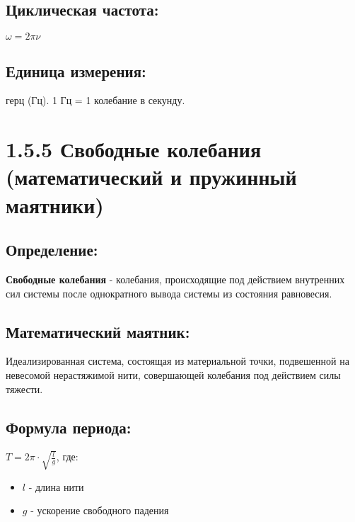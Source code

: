\documentclass[a4paper,12pt]{article}
\begin{document}
\vspace{-9pt}
\subsection*{Циклическая частота:}
\vspace{-3pt}
$\omega = 2\pi\nu$

\vspace{-9pt}
\subsection*{Единица измерения:}
\vspace{-3pt}
герц (Гц). 1 Гц = 1 колебание в секунду.

\newpage
\section*{1.5.5 Свободные колебания (математический и пружинный маятники)}

\vspace{-9pt}
\subsection*{Определение:}
\vspace{-3pt}
\textbf{Свободные колебания} - колебания, происходящие под действием внутренних сил системы после однократного вывода системы из состояния равновесия.

\vspace{-9pt}
\subsection*{Математический маятник:}
\vspace{-3pt}
Идеализированная система, состоящая из материальной точки, подвешенной на невесомой нерастяжимой нити, совершающей колебания под действием силы тяжести.

\vspace{-9pt}
\subsection*{Формула периода:}
\vspace{-3pt}
$T = 2\pi \cdot \sqrt{\frac{l}{g}}$, где:
\begin{itemize}[itemsep=0pt, topsep=0pt, parsep=0pt]
    \item $l$ - длина нити
    \item $g$ - ускорение свободного падения
\end{itemize}
\end{document}

